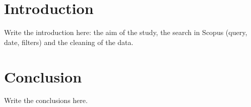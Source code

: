 \documentclass[12pt,a4paper]{report}
\title{\reporttitle}
\author{}
\date{\reportdate}
\begin{document}
\maketitle
\tableofcontents
\listoffigures
\listoftables

\chapter{Introduction}
Write the introduction here: the aim of the study, the search in Scopus (query, date, filters) and the cleaning of the data.



\chapter{Conclusion}
Write the conclusions here.
\end{document}
